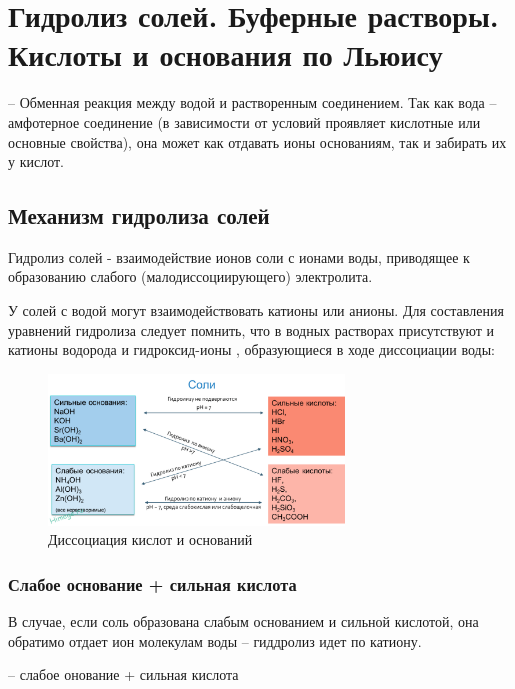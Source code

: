 \section{Гидролиз солей. Буферные растворы. Кислоты и основания по Льюису}

 -- Обменная реакция между водой и растворенным соединением. Так как вода -- амфотерное соединение (в зависимости от условий проявляет кислотные или основные свойства), она может как отдавать ионы  основаниям, так и забирать их у кислот.

\subsection{Механизм гидролиза солей}

Гидролиз солей - взаимодействие ионов соли с ионами воды, приводящее к образованию слабого (малодиссоциирующего) электролита.

У солей с водой могут взаимодействовать катионы или анионы. Для составления уравнений гидролиза следует помнить, что в водных растворах присутствуют и катионы водорода  и гидроксид-ионы , образующиеся в ходе диссоциации воды:


\begin{figure}[H]
    \centering
    \includegraphics[width = 0.7\textwidth]{Pictures/17_acidbase.png}
    \caption{Диссоциация кислот и оснований}
    \label{fig:acidbase}
\end{figure}

\subsubsection{Слабое основание + сильная кислота}

В случае, если соль образована слабым основанием и сильной кислотой, она обратимо отдает ион  молекулам воды -- гиддролиз идет по катиону.


 -- слабое онование + сильная кислота

